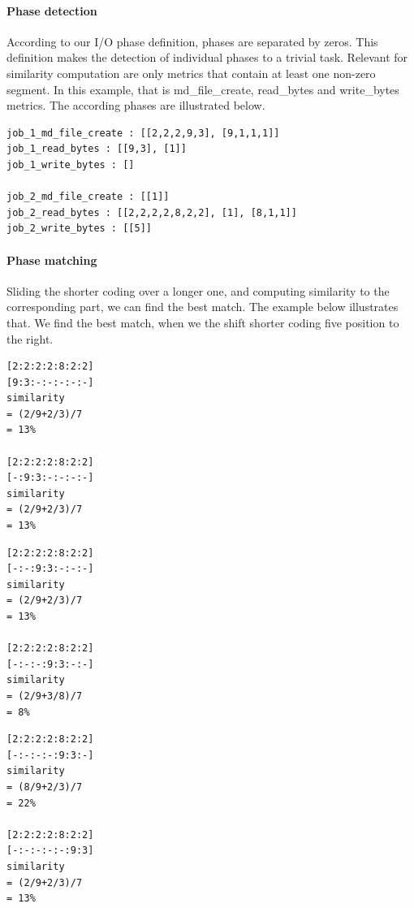 \documentclass[]{llncs}
\begin{document}
\paragraph{Phase detection}
According to our I/O phase definition, phases are separated by zeros.
This definition makes the detection of individual phases to a trivial task.
Relevant for similarity computation are only metrics that contain at least one non-zero segment.
In this example, that is md\_file\_create, read\_bytes and write\_bytes metrics.
The according phases are illustrated below.

\begin{lstlisting}
job_1_md_file_create : [[2,2,2,9,3], [9,1,1,1]]
job_1_read_bytes : [[9,3], [1]]
job_1_write_bytes : []

job_2_md_file_create : [[1]]
job_2_read_bytes : [[2,2,2,2,8,2,2], [1], [8,1,1]]
job_2_write_bytes : [[5]]
\end{lstlisting}


\paragraph{Phase matching}
Sliding the shorter coding over a longer one, and computing similarity to the corresponding part, we can find the best match.
The example below illustrates that.
We find the best match, when we the shift shorter coding five position to the right.


\noindent\begin{minipage}{0.33\textwidth}
\begin{lstlisting}
[2:2:2:2:8:2:2]
[9:3:-:-:-:-:-]
similarity 
= (2/9+2/3)/7 
= 13%

[2:2:2:2:8:2:2]
[-:9:3:-:-:-:-]
similarity 
= (2/9+2/3)/7 
= 13%
\end{lstlisting}
\end{minipage}
%
\begin{minipage}{0.33\textwidth}
\begin{lstlisting}
[2:2:2:2:8:2:2]
[-:-:9:3:-:-:-]
similarity 
= (2/9+2/3)/7 
= 13%

[2:2:2:2:8:2:2]
[-:-:-:9:3:-:-]
similarity 
= (2/9+3/8)/7
= 8%
\end{lstlisting}
\end{minipage}
%
\noindent\begin{minipage}{0.33\textwidth}
\begin{lstlisting}
[2:2:2:2:8:2:2]
[-:-:-:-:9:3:-]
similarity
= (8/9+2/3)/7
= 22%

[2:2:2:2:8:2:2]
[-:-:-:-:-:9:3]
similarity 
= (2/9+2/3)/7 
= 13%
\end{lstlisting}
\end{minipage}
\end{document}
